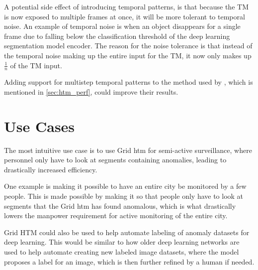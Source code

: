 \par
A potential side effect of introducing temporal patterns, is that because the TM is now exposed to multiple frames at once, it will be more tolerant to temporal noise. An example of temporal noise is when an object disappears for a single frame due to falling below the classification threshold of the deep learning segmentation model encoder. The reason for the noise tolerance is that instead of the temporal noise making up the entire input for the TM, it now only makes up $\frac{1}{n}$ of the TM input.
\par
Adding support for multistep temporal patterns to the method used by \textcite{MotionAnomalyDetection}, which is mentioned in \autoref{sec:htm_perf}, could improve their results.
\section{Use Cases}
The most intuitive use case is to use Grid \gls*{htm} for semi-active surveillance, where personnel only have to look at segments containing anomalies, leading to drastically increased efficiency.
\par
One example is making it possible to have an entire city be monitored by a few people. This is made possible by making it so that people only have to look at segments that the Grid \gls*{htm} has found anomalous, which is what drastically lowers the manpower requirement for active monitoring of the entire city.
\par
Grid HTM could also be used to help automate labeling of anomaly datasets for deep learning. This would be similar to how older deep learning networks are used to help automate creating new labeled image datasets, where the model proposes a label for an image, which is then further refined by a human if needed.
